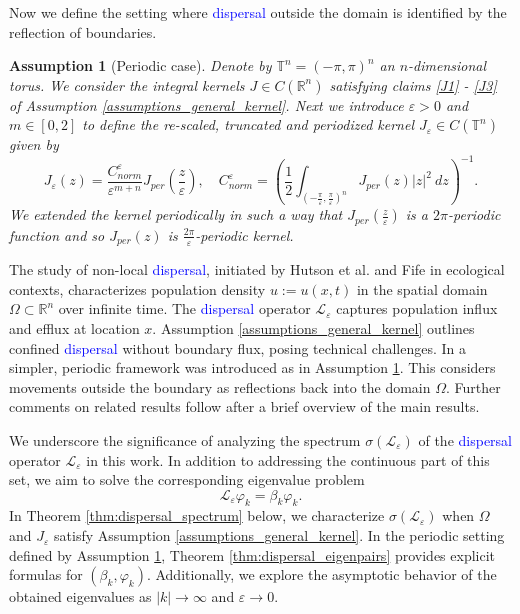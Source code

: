 \documentclass[12pt, a4paper]{article}
\theoremstyle{break}
\theoremstyle{break}
\newtheorem{asm}{Assumption}[section]
\theoremstyle{break}
\theoremstyle{break}
\theoremstyle{break}
\newcommand{\Leo}{\mathcal{L}_{\varepsilon}}
\begin{document}
Now we define the setting where \textcolor{blue}{dispersal} outside the domain is identified by the reflection of boundaries.
\begin{asm}[Periodic case]
    Denote by $\mathbb{T}^n = (-\pi, \pi)^n$ an $n$-dimensional torus. We consider the integral kernels $J \in C(\mathbb{R}^n)$ satisfying claims \ref{J1} - \ref{J3} of Assumption \ref{assumptions_general_kernel}. Next we introduce $\varepsilon > 0$ and $m \in [0,2]$ to define the re-scaled, truncated and periodized kernel $J_\varepsilon \in C(\mathbb{T}^n)$ given by
    \begin{equation}
        J_\varepsilon(z) = \frac{C_{norm}^\varepsilon}{\varepsilon^{m+n}}J_{per}\left(\frac{z}{\varepsilon} \right), \quad C_{norm}^\varepsilon = \left(\frac{1}{2} \int_{\left( -\frac{\pi}{\varepsilon}, \frac{\pi}{\varepsilon} \right)^n} J_{per}(z)|z|^2\:dz\right)^{-1}.
    \end{equation}
    We extended the kernel periodically in such a way that $J_{per}\left(\frac{z}{\varepsilon}\right)$ is a $2\pi$-periodic function and so $J_{per}(z)$ is $\frac{2\pi}{\varepsilon}$-periodic kernel.
     \label{assumptions_periodic_kernel}
\end{asm}

The study of non-local \textcolor{blue}{dispersal}, initiated by Hutson et al. \cite{Hutson2003, Hutson2005} and Fife \cite{Fife2001} in ecological contexts, characterizes population density $u := u(x,t)$ in the spatial domain $\Omega \subset \mathbb{R}^n$ over infinite time. The \textcolor{blue}{dispersal} operator $\Leo$ captures population influx and efflux at location $x$. Assumption \ref{assumptions_general_kernel} outlines confined \textcolor{blue}{dispersal} without boundary flux, posing technical challenges. In \cite{Hutson2003} a simpler, periodic framework was introduced as in Assumption \ref{assumptions_periodic_kernel}. This considers movements outside the boundary as reflections back into the domain $\Omega$. Further comments on related results follow after a brief overview of the main results.

\hspace{1pt}

We underscore the significance of analyzing the spectrum $\sigma(\Leo)$ of the \textcolor{blue}{dispersal} operator $\Leo$ in this work. In addition to addressing the continuous part of this set, we aim to solve the corresponding eigenvalue problem
\begin{equation}
    \Leo \varphi_k = \beta_k \varphi_k.
    \label{eigenvalue_problem}
\end{equation}
In Theorem \ref{thm:dispersal_spectrum} below, we characterize $\sigma(\Leo)$ when $\Omega$ and $J_\varepsilon$ satisfy Assumption \ref{assumptions_general_kernel}. In the periodic setting defined by Assumption \ref{assumptions_periodic_kernel}, Theorem \ref{thm:dispersal_eigenpairs} provides explicit formulas for $(\beta_k, \varphi_k)$. Additionally, we explore the asymptotic behavior of the obtained eigenvalues as $|k| \rightarrow \infty$ and $\varepsilon \rightarrow 0$.
\end{document}

